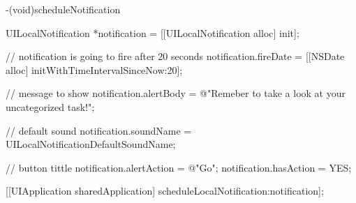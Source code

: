 \documentclass[parskip=half*]{scrartcl}
\begin{document}
\begin{verbatimtab}
-(void)scheduleNotification
{
    UILocalNotification *notification = [[UILocalNotification alloc] init];
    
    // notification is going to fire after 20 seconds
    notification.fireDate = [[NSDate alloc] initWithTimeIntervalSinceNow:20];
    
    // message to show
    notification.alertBody = @"Remeber to take a look at your uncategorized task!";
    
    // default sound
    notification.soundName = UILocalNotificationDefaultSoundName;
    
    // button tittle
    notification.alertAction = @"Go";
    notification.hasAction = YES;
    
    [[UIApplication sharedApplication] scheduleLocalNotification:notification];
}
\end{verbatimtab}
\end{document}
